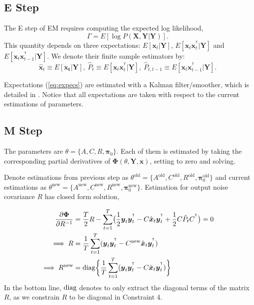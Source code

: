 \documentclass[fleqn]{article}
\let\oldref\ref
\renewcommand{\ref}[1]{(\oldref{#1})}
\newcommand{\T}{^{\ensuremath{\mathsf{T}}}}           %
\newcommand{\diag}{\operatornamewithlimits{diag}}
\providecommand{\mb}[1]{\boldsymbol{#1}}
\newcommand{\bx}{\mb{x}}
\newcommand{\by}{\mb{y}}
\newcommand{\bX}{\mb{X}}
\newcommand{\bY}{\mb{Y}}
\begin{document}
\subsection{E Step}
The E step of EM requires computing the expected log likelihood,
\[
    \Gamma = E[\log P(\bX,\bY|\bY)].
\]
This quantity depends on three expectations: $E[\bx_t|\bY]$, $E[\bx_t\bx_t^{\T}|\bY]$ and $E[\bx_t\bx_{t-1}^{\T}|\bY]$. We denote their finite sample estimators by:
\begin{equation}\label{eq:expecs}
\hat{\bx}_t \equiv E[\mathbf{x_t}|\bY],\  \hat{P}_t  \equiv E[\bx_t\bx_t^{\T}|\bY],\  \hat{P}_{t,t-1}  \equiv E[\bx_t\bx_{t-1}^{\T}|\bY].
\end{equation}

Expectations \ref{eq:expecs} are estimated with a Kalman filter/smoother, which is detailed in . Notice that all expectations are taken with respect to the current estimations of parameters.
\subsection{M Step}
The parameters are $\theta =\{A,C,R,\mathbf{\pi}_0\}$. Each of them is estimated by taking the corresponding partial derivatives of $\mathbf{\Phi}(\theta,\bY,\bx)$, setting to zero and solving.

Denote estimations from previous step as $\theta^{\text{old}} =\{A^{\text{old}},C^{\text{old}},R^{\text{old}},\mathbf{\pi}_0^{\text{old}}\}$ and current estimations as $\theta^{\text{new}} =\{A^{\text{new}},C^{\text{new}},R^{\text{new}},\mathbf{\pi}_0^{\text{new}}\}$. Estimation for output noise covariance $R$ has closed form solution,

\begin{equation}\label{eq:updateR}
\begin{aligned}
\frac{\partial \mathbf{\Phi}}{\partial R^{-1}} &= \frac{T}{2}R - \sum\limits_{t=1}^T\bigl(\frac{1}{2}\by_t\by_t^{\T} - C\hat{\bx}_t\by_t^{\T}+\frac{1}{2}C\hat{P}_tC^{\T}\bigr) =0 \\
\implies R &= \frac{1}{T}\sum\limits_{t=1}^{T}(\by_t\by_t^{\T}-C^{\text{new}}\hat{\bx}_t\by_t^{\T})\\
\implies R^{\text{new}} &= \diag \biggl\{\frac{1}{T}\sum\limits_{t=1}^{T}(\by_t\by_t^{\T}-C\hat{\bx}_t\by_t^{\T})\biggr\}
\end{aligned}
\end{equation}
In the bottom line, $\diag$ denotes to only extract the diagonal terms of the matrix $R$, as we constrain $R$ to be diagonal in Constraint 4.
\end{document}
